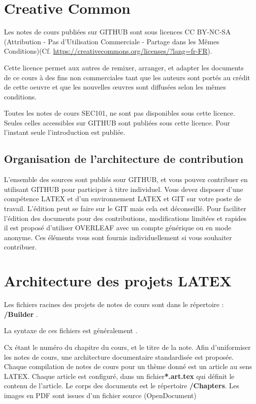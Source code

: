 \section{Creative Common}

Les notes de cours publiées sur GITHUB sont sous licences CC BY-NC-SA (Attribution - Pas d’Utilisation Commerciale - Partage dans les Mêmes Conditions)(Cf. \url{https://creativecommons.org/licenses/?lang=fr-FR}).

Cette licence permet aux autres de remixer, arranger, et adapter les documents de ce cours à des fins non commerciales tant que les auteurs sont portés au crédit de cette oeuvre et que les nouvelles œuvres sont diffusées selon les mêmes conditions.

Toutes les notes de cours SEC101, ne sont pas disponibles sous cette licence. Seules celles accessibles sur GITHUB sont publiées sous cette licence. Pour l'instant seule l'introduction est publiée.



\subsection{Organisation de l'architecture de contribution}

L'ensemble des sources sont publiés sour GITHUB, et vous pouvez contribuer en utilisant GITHUB pour participer à titre individuel. Vous devez disposer d'une compétence LATEX et d'un environnement LATEX et GIT sur votre poste de travail. L'édition peut se faire sur le GIT mais cela est déconseillé. Pour faciliter l'édition des documents pour des contributions, modifications limitées et rapides il est proposé d'utiliser OVERLEAF avec un compte générique ou en mode anonyme. Ces éléments vous sont fournis individuellement si vous souhaiter contribuer.

\section{Architecture des projets LATEX}

Les fichiers racines des projets de notes de cours sont dans le répertoire : \textbf{/Builder} . 


La syntaxe de ces fichiers est généralement . 

Cx étant le numéro du chapitre du cours, et  le titre de la note.
Afin d'uniformiser les notes de cours, une architecture documentaire standardisée est proposée. 
Chaque compilation de notes de cours pour un thème donné est un article au sens LATEX. Chaque article est configuré, dans un fichier\textbf{*.art.tex} qui définit le contenu de l'article. Le corps des documents est le répertoire \textbf{/Chapters}. 
Les images en PDF sont issues d'un fichier source (OpenDocument)

